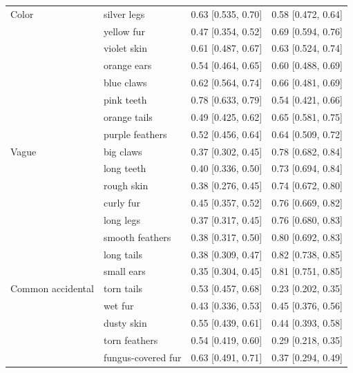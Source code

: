 \documentclass[10pt,letterpaper]{article}
\begin{document}
\begin{table}[h]
\begin{tabular}{| l || l | l | l |}
Color            & silver legs        & 0.63 {[}0.535, 0.70{]} & 0.58 {[}0.472, 0.64{]} \\
                 & yellow fur         & 0.47 {[}0.354, 0.52{]} & 0.69 {[}0.594, 0.76{]} \\
                 & violet skin        & 0.61 {[}0.487, 0.67{]} & 0.63 {[}0.524, 0.74{]} \\
                 & orange ears        & 0.54 {[}0.464, 0.65{]} & 0.60 {[}0.488, 0.69{]} \\
                 & blue claws         & 0.62 {[}0.564, 0.74{]} & 0.66 {[}0.481, 0.69{]} \\
                 & pink teeth         & 0.78 {[}0.633, 0.79{]} & 0.54 {[}0.421, 0.66{]} \\
                 & orange tails       & 0.49 {[}0.425, 0.62{]} & 0.65 {[}0.581, 0.75{]} \\
                 & purple feathers    & 0.52 {[}0.456, 0.64{]} & 0.64 {[}0.509, 0.72{]} \\
Vague            & big claws          & 0.37 {[}0.302, 0.45{]} & 0.78 {[}0.682, 0.84{]} \\
                 & long teeth         & 0.40 {[}0.336, 0.50{]} & 0.73 {[}0.694, 0.84{]} \\
                 & rough skin         & 0.38 {[}0.276, 0.45{]} & 0.74 {[}0.672, 0.80{]} \\
                 & curly fur          & 0.45 {[}0.357, 0.52{]} & 0.76 {[}0.669, 0.82{]} \\
                 & long legs          & 0.37 {[}0.317, 0.45{]} & 0.76 {[}0.680, 0.83{]} \\
                 & smooth feathers    & 0.38 {[}0.317, 0.50{]} & 0.80 {[}0.692, 0.83{]} \\
                 & long tails         & 0.38 {[}0.309, 0.47{]} & 0.82 {[}0.738, 0.85{]} \\
                 & small ears         & 0.35 {[}0.304, 0.45{]} & 0.81 {[}0.751, 0.85{]} \\
Common accidental & torn tails         & 0.53 {[}0.457, 0.68{]} & 0.23 {[}0.202, 0.35{]} \\
      & wet fur            & 0.43 {[}0.336, 0.53{]} & 0.45 {[}0.376, 0.56{]} \\
      & dusty skin         & 0.55 {[}0.439, 0.61{]} & 0.44 {[}0.393, 0.58{]} \\
      & torn feathers      & 0.54 {[}0.419, 0.60{]} & 0.29 {[}0.218, 0.35{]} \\
      & fungus-covered fur & 0.63 {[}0.491, 0.71{]} & 0.37 {[}0.294, 0.49{]} \\

\end{tabular}
\end{table}
\end{document}
